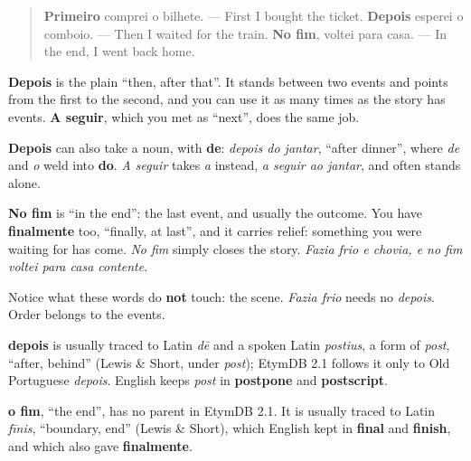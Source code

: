 \begin{grammarlens}[title={Grammar Lens: three places in a story}]
\begin{quote}
\textbf{Primeiro} comprei o bilhete. — First I bought the ticket. \textbf{Depois} esperei o comboio. — Then I waited for the train. \textbf{No fim}, voltei para casa. — In the end, I went back home.
\end{quote}

\textbf{Depois} is the plain \textquotedblleft{}then, after that\textquotedblright{}. It stands between two events and points from the first to the second, and you can use it as many times as the story has events. \textbf{A seguir}, which you met as \textquotedblleft{}next\textquotedblright{}, does the same job.

\textbf{Depois} can also take a noun, with \textbf{de}: \emph{depois do jantar}, \textquotedblleft{}after dinner\textquotedblright{}, where \emph{de} and \emph{o} weld into \textbf{do}. \emph{A seguir} takes \emph{a} instead, \emph{a seguir ao jantar}, and often stands alone.

\textbf{No fim} is \textquotedblleft{}in the end\textquotedblright{}: the last event, and usually the outcome. You have \textbf{finalmente} too, \textquotedblleft{}finally, at last\textquotedblright{}, and it carries relief: something you were waiting for has come. \emph{No fim} simply closes the story. \emph{Fazia frio e chovia, e no fim voltei para casa contente.}

Notice what these words do \textbf{not} touch: the scene. \emph{Fazia frio} needs no \emph{depois}. Order belongs to the events.
\end{grammarlens}

\begin{cousinweb}
\textbf{depois} is usually traced to Latin \emph{dē} and a spoken Latin \emph{postius}, a form of \emph{post}, \textquotedblleft{}after, behind\textquotedblright{} (Lewis \& Short, under \emph{post}); EtymDB 2.1 follows it only to Old Portuguese \emph{depois}. English keeps \emph{post} in \textbf{postpone} and \textbf{postscript}.

\textbf{o fim}, \textquotedblleft{}the end\textquotedblright{}, has no parent in EtymDB 2.1. It is usually traced to Latin \emph{fīnis}, \textquotedblleft{}boundary, end\textquotedblright{} (Lewis \& Short), which English kept in \textbf{final} and \textbf{finish}, and which also gave \textbf{finalmente}.
\end{cousinweb}

